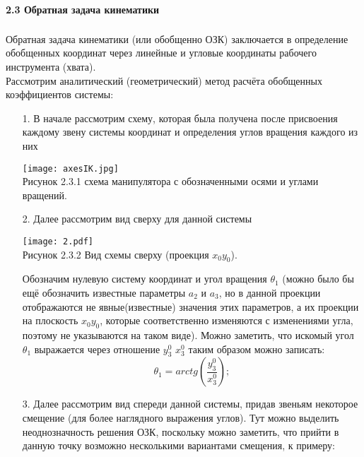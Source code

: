 \paragraph*{2.3 Обратная задача кинематики}$\phantom{-}$\\
\hspace*{\parindent}Обратная задача кинематики (или обобщенно ОЗК) заключается в определение обобщенных координат через линейные и угловые координаты рабочего инструмента (хвата). \\

\hspace*{\parindent}Рассмотрим аналитический (геометрический) метод расчёта обобщенных коэффициентов системы:\\
\begin{enumerate} 
\item[1.]  В начале рассмотрим схему, которая была получена после присвоения каждому звену системы координат и определения углов вращения каждого из них\\

\begin{center}
    \texttt{[image: axesIK.jpg]}\\
    Рисунок 2.3.1 схема манипулятора с обозначенными осями и углами вращений.\\
\end{center}

\item[2.] Далее рассмотрим вид сверху для данной системы\\

\begin{center}
    \texttt{[image: 2.pdf]}\\
     Рисунок 2.3.2 Вид схемы сверху (проекция $x_0 y_0$).\\
\end{center}


Обозначим нулевую систему координат и угол вращения $\theta_1$ (можно было бы ещё обозначить известные параметры $a_2$ и  $a_3$, но в данной проекции отображаются не явные(известные) значения этих параметров, а их проекции на плоскость $x_0 y_0$, которые соответственно изменяются с изменениями угла, поэтому не указываются на таком виде). Можно заметить, что искомый угол $\theta_1$ выражается через отношение $y_3^0$ $x_3^0$ таким образом можно записать:\\
$$\theta_1=arctg(\frac{y_3^0}{x_3^0});$$

\item[3.] Далее рассмотрим вид спереди данной системы, придав звеньям некоторое смещение (для более наглядного выражения углов). Тут можно выделить неоднозначность решения ОЗК, поскольку можно заметить, что прийти в данную точку возможно несколькими вариантами смещения, к примеру:\\


\end{enumerate}
